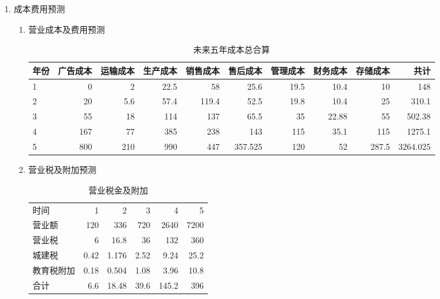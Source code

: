 \begin{enumerate}
\begin{enumerate}[(1)]
      \item 成本费用预测

            \begin{enumerate}[$\bullet$]
            \item 营业成本及费用预测

                  {\footnotesize{\begin{longtable}{|lrrrrrrrrr|}
                  \caption{未来五年成本总合算} \\
                  \hline
                  年份  & 广告成本  & 运输成本  & 生产成本  & 销售成本  & 售后成本  & 管理成本  & 财务成本  & 存储成本  & 共计 \\
                  \hline
                  1     & 0     & 2     & 22.5  & 58    & 25.6  & 19.5  & 10.4  & 10    & 148 \\
                  2     & 20    & 5.6   & 57.4  & 119.4 & 52.5  & 19.8  & 10.4  & 25    & 310.1 \\
                  3     & 55    & 18    & 114   & 137   & 65.5  & 35    & 22.88 & 55    & 502.38 \\
                  4     & 167   & 77    & 385   & 238   & 143   & 115   & 35.1  & 115   & 1275.1 \\
                  5     & 800   & 210   & 990   & 447   & 357.525 & 120   & 52    & 287.5 & 3264.025 \\
                  \hline
                  \end{longtable}}}

            \item 营业税及附加预测

                  \begin{table}[htbp]
                  \centering
                  \caption{营业税金及附加}
                  \begin{tabular}{|lrrrrr|}
                  \toprule
                  时间    & 1     & 2     & 3     & 4     & 5 \\
                  营业额   & 120   & 336   & 720   & 2640  & 7200 \\
                  营业税   & 6     & 16.8  & 36    & 132   & 360 \\
                  城建税   & 0.42  & 1.176 & 2.52  & 9.24  & 25.2 \\
                  教育税附加 & 0.18  & 0.504 & 1.08  & 3.96  & 10.8 \\
                  合计    & 6.6   & 18.48 & 39.6  & 145.2 & 396 \\
                  \bottomrule
                  \end{tabular}%
                  \label{tab:addlabel}%
                  \end{table}%

            \end{enumerate}
      \end{enumerate}
\end{enumerate}

